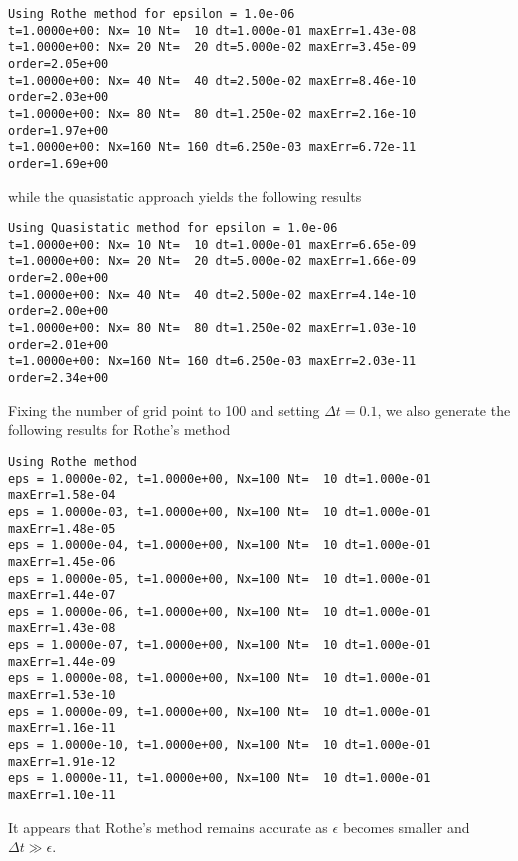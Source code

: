 \documentclass[11pt]{article}
\numberwithin{equation}{section}
\newcommand{\dt}{\Delta t}
\begin{document}
\begin{footnotesize}
\begin{Verbatim}[frame = single]
Using Rothe method for epsilon = 1.0e-06
t=1.0000e+00: Nx= 10 Nt=  10 dt=1.000e-01 maxErr=1.43e-08
t=1.0000e+00: Nx= 20 Nt=  20 dt=5.000e-02 maxErr=3.45e-09 order=2.05e+00
t=1.0000e+00: Nx= 40 Nt=  40 dt=2.500e-02 maxErr=8.46e-10 order=2.03e+00
t=1.0000e+00: Nx= 80 Nt=  80 dt=1.250e-02 maxErr=2.16e-10 order=1.97e+00
t=1.0000e+00: Nx=160 Nt= 160 dt=6.250e-03 maxErr=6.72e-11 order=1.69e+00
\end{Verbatim}
\end{footnotesize}
while the quasistatic approach yields the following results
\begin{footnotesize}
\begin{Verbatim}[frame = single]
Using Quasistatic method for epsilon = 1.0e-06
t=1.0000e+00: Nx= 10 Nt=  10 dt=1.000e-01 maxErr=6.65e-09
t=1.0000e+00: Nx= 20 Nt=  20 dt=5.000e-02 maxErr=1.66e-09 order=2.00e+00
t=1.0000e+00: Nx= 40 Nt=  40 dt=2.500e-02 maxErr=4.14e-10 order=2.00e+00
t=1.0000e+00: Nx= 80 Nt=  80 dt=1.250e-02 maxErr=1.03e-10 order=2.01e+00
t=1.0000e+00: Nx=160 Nt= 160 dt=6.250e-03 maxErr=2.03e-11 order=2.34e+00
\end{Verbatim}
\end{footnotesize}
Fixing the number of grid point to 100 and setting $\dt = 0.1$, we also generate the following results for Rothe's method
\begin{footnotesize}
\begin{Verbatim}[frame = single]
Using Rothe method
eps = 1.0000e-02, t=1.0000e+00, Nx=100 Nt=  10 dt=1.000e-01 maxErr=1.58e-04
eps = 1.0000e-03, t=1.0000e+00, Nx=100 Nt=  10 dt=1.000e-01 maxErr=1.48e-05
eps = 1.0000e-04, t=1.0000e+00, Nx=100 Nt=  10 dt=1.000e-01 maxErr=1.45e-06
eps = 1.0000e-05, t=1.0000e+00, Nx=100 Nt=  10 dt=1.000e-01 maxErr=1.44e-07
eps = 1.0000e-06, t=1.0000e+00, Nx=100 Nt=  10 dt=1.000e-01 maxErr=1.43e-08
eps = 1.0000e-07, t=1.0000e+00, Nx=100 Nt=  10 dt=1.000e-01 maxErr=1.44e-09
eps = 1.0000e-08, t=1.0000e+00, Nx=100 Nt=  10 dt=1.000e-01 maxErr=1.53e-10
eps = 1.0000e-09, t=1.0000e+00, Nx=100 Nt=  10 dt=1.000e-01 maxErr=1.16e-11
eps = 1.0000e-10, t=1.0000e+00, Nx=100 Nt=  10 dt=1.000e-01 maxErr=1.91e-12
eps = 1.0000e-11, t=1.0000e+00, Nx=100 Nt=  10 dt=1.000e-01 maxErr=1.10e-11
\end{Verbatim}
\end{footnotesize}
It appears that Rothe's method remains accurate as $\epsilon$ becomes smaller and $\dt\gg\epsilon$. 
\end{document}
